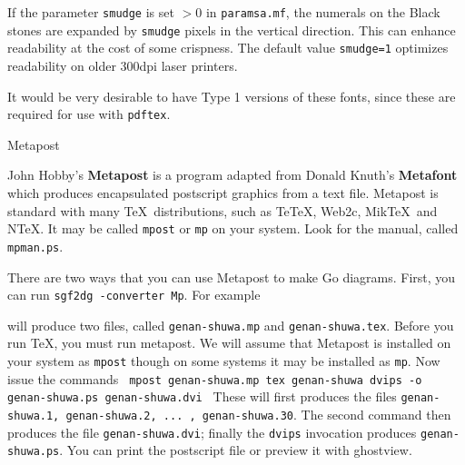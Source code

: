 If the parameter {\tt smudge} is set $>0$ in {\tt paramsa.mf}, the numerals on
the Black stones are expanded by {\tt smudge} pixels in the vertical
direction. This can enhance readability at the cost of some crispness.
The default value {\tt smudge=1} optimizes readability on older
300dpi laser printers.

\bigbreak

It would be very desirable to have Type 1 versions of these fonts,
since these are required for use with {\tt pdftex}.

% 
% 

\vfil\eject

\centerline{\titlefont Metapost}
\medbreak
John Hobby's {\bf Metapost} is a program adapted from Donald Knuth's {\bf
Metafont} which produces encapsulated postscript graphics from a text
file. Metapost is standard with many \TeX\ distributions, such as Te\TeX,
Web2c, Mik\TeX\ and N\TeX. It may be called {\tt mpost} or {\tt mp} on
your system. Look for the manual, called {\tt mpman.ps}.

There are two ways that you can use Metapost to make Go diagrams.
First, you can run {\tt sgf2dg -converter Mp}. For example
\medskip
\centerline{}
\medskip
will produce two files, called {\tt genan-shuwa.mp} and
{\tt genan-shuwa.tex}. Before you run TeX, you must run
metapost. We will assume that Metapost is installed on your
system as {\tt mpost} though on some systems it may be installed
as {\tt mp}. Now issue the commands
\medskip
\medbreak
{\tt\obeylines\obeyspaces
mpost genan-shuwa.mp
tex genan-shuwa
dvips -o genan-shuwa.ps genan-shuwa.dvi
}
\medskip
These will first produces the files {\tt genan-shuwa.1,
genan-shuwa.2, ... , genan-shuwa.30}. 
The second command then produces the file {\tt genan-shuwa.dvi};
finally the {\tt dvips} invocation produces {\tt genan-shuwa.ps}.
You can print the postscript file or preview it with ghostview.

